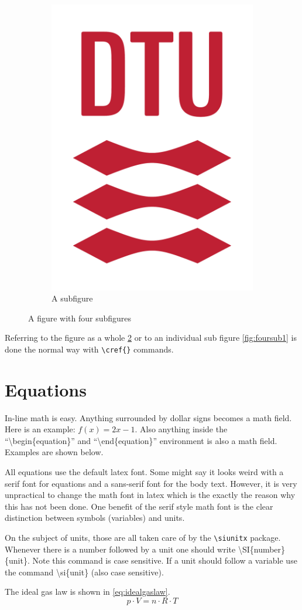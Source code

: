 \documentclass[../main.tex]{subfiles}
\begin{document}
\begin{figure}[H]
\begin{subfigure}{.49\textwidth}
  \centering
  \includegraphics[width=.3\linewidth]{Pictures/Logos/dtured_cmyk.pdf}
  \caption{A subfigure}
  \label{fig:foursub4}
\end{subfigure}
\caption{A figure with four subfigures}
\label{fig:foursubfigures}
\end{figure}

Referring to the figure as a whole \cref{fig:foursubfigures} or to an individual sub figure \cref{fig:foursub1} is done the normal way with \texttt{\textbackslash cref\{\}} commands.


\section{Equations}
In-line math is easy. Anything surrounded by dollar signs becomes a math field. Here is an example: $f(x)=2x-1$. Also anything inside the ``\textbackslash begin\{equation\}'' and  ``\textbackslash end\{equation\}'' environment is also a math field. Examples are shown below. 

All equations use the default latex font. Some might say it looks weird with a serif font for equations and a sans-serif font for the body text. However, it is very unpractical to change the math font in latex which is the exactly the reason why this has not been done. One benefit of the serif style math font is the clear distinction between symbols (variables) and units. 

On the subject of units, those are all taken care of by the \texttt{\textbackslash siunitx} package. Whenever there is a number followed by a unit one should write \textbackslash SI\{number\}\{unit\}. Note this command is case sensitive. If a unit should follow a variable use the command \textbackslash si\{unit\} (also case sensitive). 

The ideal gas law is shown in \cref{eq:idealgaslaw}.
\begin{equation} \label{eq:idealgaslaw}
    p \cdot V = n \cdot R \cdot T
\end{equation}
\end{document}
